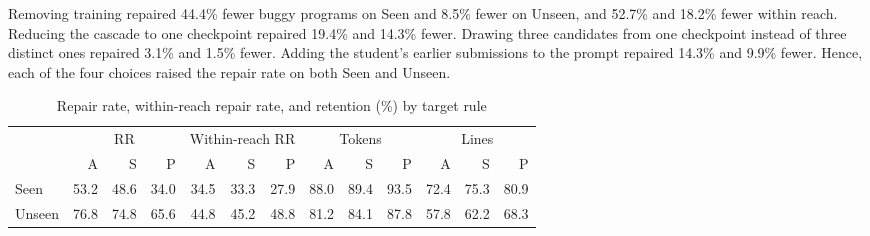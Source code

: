 \documentclass[conference]{IEEEtran}
\begin{document}
Removing training repaired 44.4\% fewer buggy programs on Seen and 8.5\% fewer on Unseen, and 52.7\% and 18.2\% fewer within reach. Reducing the cascade to one checkpoint repaired 19.4\% and 14.3\% fewer. Drawing three candidates from one checkpoint instead of three distinct ones repaired 3.1\% and 1.5\% fewer. Adding the student's earlier submissions to the prompt repaired 14.3\% and 9.9\% fewer. Hence, each of the four choices raised the repair rate on both Seen and Unseen.

\begin{table}[h]
\caption{Repair rate, within-reach repair rate, and retention (\%) by target rule}
\label{tab:targets}
\centering\scriptsize
\setlength{\tabcolsep}{2.5pt}
\begin{tabular}{l|rrr|rrr|rrr|rrr}
\toprule
 & \multicolumn{3}{c|}{RR} & \multicolumn{3}{c|}{Within-reach RR} & \multicolumn{3}{c|}{Tokens} & \multicolumn{3}{c}{Lines} \\
 & A & S & P & A & S & P & A & S & P & A & S & P \\
\midrule
Seen & 53.2 & 48.6 & 34.0 & 34.5 & 33.3 & 27.9 & 88.0 & 89.4 & 93.5 & 72.4 & 75.3 & 80.9 \\
Unseen & 76.8 & 74.8 & 65.6 & 44.8 & 45.2 & 48.8 & 81.2 & 84.1 & 87.8 & 57.8 & 62.2 & 68.3 \\
\bottomrule
\end{tabular}
\end{table}
\end{document}
